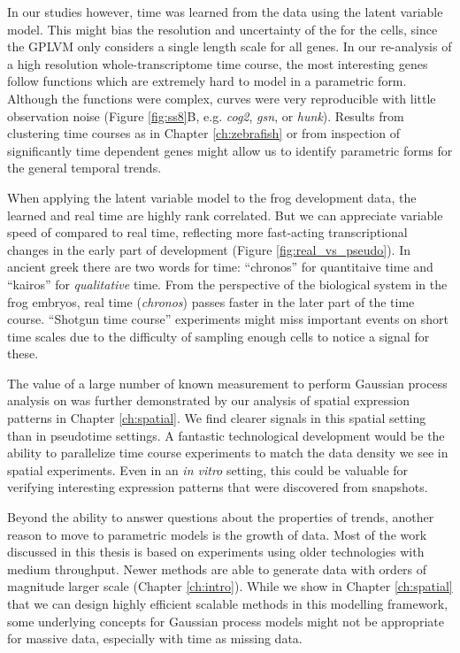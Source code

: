 In our studies however, time was learned from the data using the latent variable model. This might bias the resolution and uncertainty of the  for the cells, since the GPLVM only considers a single length scale for all genes. In our re-analysis of a high resolution whole-transcriptome time course, the most interesting genes follow functions which are extremely hard to model in a parametric form. Although the functions were complex, curves were very reproducible with little observation noise (Figure \ref{fig:ss8}B, e.g. \textit{cog2}, \textit{gsn}, or \textit{hunk}). Results from clustering time courses as in Chapter \ref{ch:zebrafish} or from inspection of significantly time dependent genes might allow us to identify parametric forms for the general temporal trends.

When applying the latent variable model to the frog development data, the learned  and real time are highly rank correlated. But we can appreciate variable speed of  compared to real time, reflecting more fast-acting transcriptional changes in the early part of development (Figure \ref{fig:real_vs_pseudo}). In ancient greek there are two words for time: ``chronos'' for quantitaive time and ``kairos'' for \textit{qualitative} time. From the perspective of the biological system in the frog embryos, real time (\textit{chronos}) passes faster in the later part of the time course. ``Shotgun time course'' experiments might miss important events on short time scales due to the difficulty of sampling enough cells to notice a signal for these.

The value of a large number of known measurement to perform Gaussian process analysis on was further demonstrated by our analysis of spatial expression patterns in Chapter \ref{ch:spatial}. We find clearer signals in this spatial setting than in pseudotime settings. A fantastic technological development would be the ability to parallelize time course experiments to match the data density we see in spatial experiments. Even in an \textit{in vitro} setting, this could be valuable for verifying interesting expression patterns that were discovered from snapshots.

Beyond the ability to answer questions about the properties of trends, another reason to move to parametric models is the growth of data. Most of the work discussed in this thesis is based on experiments using older technologies with medium throughput. Newer methods are able to generate data with orders of magnitude larger scale (Chapter \ref{ch:intro}). While we show in Chapter \ref{ch:spatial} that we can design highly efficient scalable methods in this modelling framework, some underlying concepts for Gaussian process models might not be appropriate for massive data, especially with  time as missing data.

